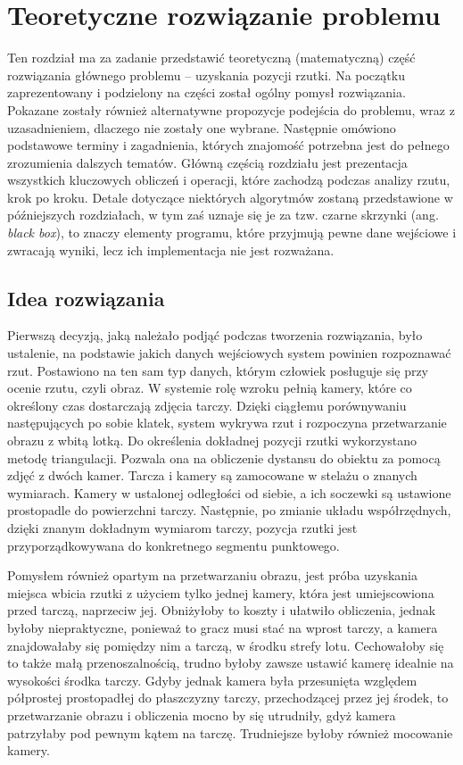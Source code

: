 \chapter{Teoretyczne rozwiązanie problemu}
\thispagestyle{chapterBeginStyle}

Ten rozdział ma za zadanie przedstawić teoretyczną (matematyczną) część rozwiązania głównego problemu -- uzyskania pozycji rzutki. Na początku zaprezentowany i podzielony na części został ogólny pomysł rozwiązania. Pokazane zostały również alternatywne propozycje podejścia do problemu, wraz z uzasadnieniem, dlaczego nie zostały one wybrane. Następnie omówiono podstawowe terminy i zagadnienia, których znajomość potrzebna jest do pełnego zrozumienia dalszych tematów. Główną częścią rozdziału jest prezentacja wszystkich kluczowych obliczeń i operacji, które zachodzą podczas analizy rzutu, krok po kroku. Detale dotyczące niektórych algorytmów zostaną przedstawione w późniejszych rozdziałach, w tym zaś uznaje się je za tzw. czarne skrzynki (ang. \textit{black box}), to znaczy elementy programu, które przyjmują pewne dane wejściowe i zwracają wyniki, lecz ich implementacja nie jest rozważana.

\section{Idea rozwiązania}
Pierwszą decyzją, jaką należało podjąć podczas tworzenia rozwiązania, było ustalenie, na podstawie jakich danych wejściowych system powinien rozpoznawać rzut. Postawiono na ten sam typ danych, którym człowiek posługuje się przy ocenie rzutu, czyli obraz. W systemie rolę wzroku pełnią kamery, które co określony czas dostarczają zdjęcia tarczy. Dzięki ciągłemu porównywaniu następujących po sobie klatek, system wykrywa rzut i rozpoczyna przetwarzanie obrazu z wbitą lotką. Do określenia dokładnej pozycji rzutki wykorzystano metodę triangulacji. Pozwala ona na obliczenie dystansu do obiektu za pomocą zdjęć z dwóch kamer. Tarcza i kamery są zamocowane w stelażu o znanych wymiarach. Kamery w ustalonej odległości od siebie, a ich soczewki są ustawione prostopadle do powierzchni tarczy. Następnie, po zmianie układu współrzędnych, dzięki znanym dokładnym wymiarom tarczy, pozycja rzutki jest przyporządkowywana do konkretnego segmentu punktowego.

Pomysłem również opartym na przetwarzaniu obrazu, jest próba uzyskania miejsca wbicia rzutki z użyciem tylko jednej kamery, która jest umiejscowiona przed tarczą, naprzeciw jej. Obniżyłoby to koszty i ułatwiło obliczenia, jednak byłoby niepraktyczne, ponieważ to gracz musi stać na wprost tarczy, a kamera znajdowałaby się pomiędzy nim a tarczą, w środku strefy lotu. Cechowałoby się to także małą przenoszalnością, trudno byłoby zawsze ustawić kamerę idealnie na wysokości środka tarczy. Gdyby jednak kamera była przesunięta względem półprostej prostopadłej do płaszczyzny tarczy, przechodzącej przez jej środek, to przetwarzanie obrazu i obliczenia mocno by się utrudniły, gdyż kamera patrzyłaby pod pewnym kątem na tarczę. Trudniejsze byłoby również mocowanie kamery.

